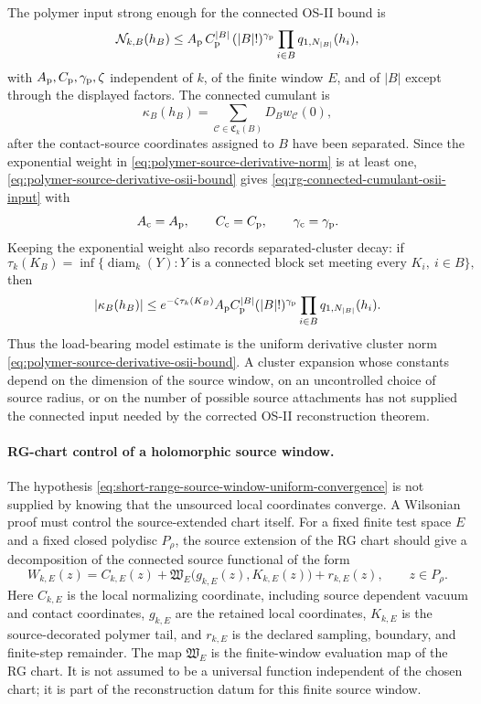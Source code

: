 The polymer input strong enough for the connected OS-II bound is
\begin{equation}
  \mathcal N_{k,B}(h_B)
  \le
  A_{\rm p}\,C_{\rm p}^{|B|}\,(|B|!)^{\gamma_{\rm p}}
  \prod_{i\in B}q_{1,N_{|B|}}(h_i),
  \label{eq:polymer-source-derivative-osii-bound}
\end{equation}
with \(A_{\rm p},C_{\rm p},\gamma_{\rm p},\zeta\) independent of \(k\), of the
finite window \(E\), and of \(|B|\) except through the displayed factors.  The
connected cumulant is
\[
  \kappa_B(h_B)=\sum_{\mathcal C\in\mathfrak C_k(B)}D_Bw_{\mathcal C}(0),
\]
after the contact-source coordinates assigned to \(B\) have been separated.
Since the exponential weight in
\eqref{eq:polymer-source-derivative-norm} is at least one,
\eqref{eq:polymer-source-derivative-osii-bound} gives
\eqref{eq:rg-connected-cumulant-osii-input} with
\[
  A_{\rm c}=A_{\rm p},\qquad
  C_{\rm c}=C_{\rm p},\qquad
  \gamma_{\rm c}=\gamma_{\rm p}.
\]
Keeping the exponential weight also records separated-cluster decay: if
\[
  \tau_k(K_B)=
  \inf\{\operatorname{diam}_k(Y):Y
  \text{ is a connected block set meeting every }K_i,\ i\in B\},
\]
then
\[
  |\kappa_B(h_B)|
  \le
  e^{-\zeta\tau_k(K_B)}
  A_{\rm p}C_{\rm p}^{|B|}(|B|!)^{\gamma_{\rm p}}
  \prod_{i\in B}q_{1,N_{|B|}}(h_i).
\]
Thus the load-bearing model estimate is the uniform derivative cluster norm
\eqref{eq:polymer-source-derivative-osii-bound}.  A cluster expansion whose
constants depend on the dimension of the source window, on an uncontrolled
choice of source radius, or on the number of possible source attachments has
not supplied the connected input needed by the corrected OS-II reconstruction
theorem.

\paragraph{RG-chart control of a holomorphic source window.}
The hypothesis
\eqref{eq:short-range-source-window-uniform-convergence} is not supplied by
knowing that the unsourced local coordinates converge.  A Wilsonian proof
must control the source-extended chart itself.  For a fixed finite test
space \(E\) and a fixed closed polydisc \(P_\rho\), the source extension of
the RG chart should give a decomposition of the connected source functional
of the form
\begin{equation}
  W_{k,E}(z)
  =
  C_{k,E}(z)
  +
  \mathfrak W_E\bigl(g_{k,E}(z),K_{k,E}(z)\bigr)
  +
  r_{k,E}(z),
  \qquad z\in P_\rho .
  \label{eq:short-range-source-window-rg-chart-decomposition}
\end{equation}
Here \(C_{k,E}\) is the local normalizing coordinate, including source
dependent vacuum and contact coordinates, \(g_{k,E}\) are the retained local
coordinates, \(K_{k,E}\) is the source-decorated polymer tail, and
\(r_{k,E}\) is the declared sampling, boundary, and finite-step remainder.
The map \(\mathfrak W_E\) is the finite-window evaluation map of the RG
chart.  It is not assumed to be a universal function independent of the
chosen chart; it is part of the reconstruction datum for this finite source
window.

